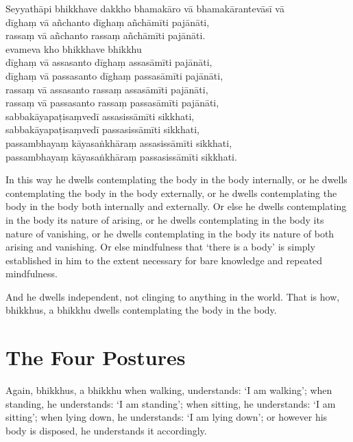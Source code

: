 \enlargethispage{\baselineskip}

Seyyathāpi bhikkhave dakkho bhamakāro vā bhamakārantevāsī vā\\
dīghaṃ vā añchanto dīghaṃ añchāmīti pajānāti,\\
rassaṃ vā añchanto rassaṃ añchāmīti pajānāti.\\
evameva kho bhikkhave bhikkhu\\
dīghaṃ vā assasanto dīghaṃ assasāmīti pajānāti,\\
dīghaṃ vā passasanto dīghaṃ passasāmīti pajānāti,\\
rassaṃ vā assasanto rassaṃ assasāmīti pajānāti,\\
rassaṃ vā passasanto rassaṃ passasāmīti pajānāti,\\
sabbakāyapaṭisaṃvedī assasissāmīti sikkhati,\\
sabbakāyapaṭisaṃvedī passasissāmīti sikkhati,\\
passambhayaṃ kāyasaṅkhāraṃ assasissāmīti sikkhati,\\
passambhayaṃ kāyasaṅkhāraṃ passasissāmīti sikkhati.

\englishPage

In this way he dwells contemplating the body in the body internally, or he
dwells contemplating the body in the body externally, or he dwells contemplating
the body in the body both internally and externally. Or else he dwells
contemplating in the body its nature of arising, or he dwells contemplating in
the body its nature of vanishing, or he dwells contemplating in the body its
nature of both arising and vanishing. Or else mindfulness that ‘there is a body’
is simply established in him to the extent necessary for bare knowledge and
repeated mindfulness.

And he dwells independent, not clinging to anything in the world. That is how,
bhikkhus, a bhikkhu dwells contemplating the body in the body.


\section{The Four Postures}

Again, bhikkhus, a bhikkhu when walking, understands: ‘I am walking’; when
standing, he understands: ‘I am standing’; when sitting, he understands: ‘I am
sitting’; when lying down, he understands: ‘I am lying down’; or however his
body is disposed, he understands it accordingly.


